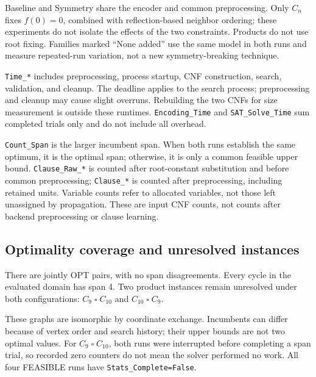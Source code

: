 Baseline and Symmetry share the encoder and common preprocessing. Only $C_n$
fixes $f(0)=0$, combined with reflection-based neighbor ordering; these
experiments do not isolate the effects of the two constraints. Products do
not use root fixing. Families marked ``None added'' use the same model in
both runs and measure repeated-run variation, not a new symmetry-breaking technique.

\texttt{Time\_*} includes preprocessing, process startup, CNF construction,
search, validation, and cleanup. The deadline applies to the search process;
preprocessing and cleanup may cause slight overruns. Rebuilding the two
CNFs for size measurement is outside these runtimes.
\texttt{Encoding\_Time} and \texttt{SAT\_Solve\_Time} sum completed trials
only and do not include all overhead.

\texttt{Count\_Span} is the larger incumbent span. When both runs establish
the same optimum, it is the optimal span; otherwise, it is only a common
feasible upper bound. \texttt{Clause\_Raw\_*} is counted after root-constant
substitution and before common preprocessing; \texttt{Clause\_*} is counted
after preprocessing, including retained units. Variable counts refer to
allocated variables, not those left unassigned by propagation. These are
input CNF counts, not counts after backend preprocessing or clause learning.

\subsection{Optimality coverage and unresolved instances}
\begin{table}[H]
\caption{Symmetry-run coverage by family.}
\centering\small\setlength{\tabcolsep}{4pt}

\end{table}
There are \PairedOpt{} jointly OPT pairs, with no span disagreements.
Every cycle in the evaluated domain has span 4. Two product instances
remain unresolved under both configurations:
$C_9\mathbin{\square}C_{10}$ and $C_{10}\mathbin{\square}C_9$.
\begin{table}[H]
\caption{Unresolved symmetry-run intervals.}
\centering\small
{}
\end{table}
These graphs are isomorphic by coordinate exchange. Incumbents can differ
because of vertex order and search history; their upper bounds are not two
optimal values. For $C_9\mathbin{\square}C_{10}$, both runs were interrupted
before completing a span trial, so recorded zero counters do not mean the
solver performed no work. All four FEASIBLE runs have
\texttt{Stats\_Complete=False}.

